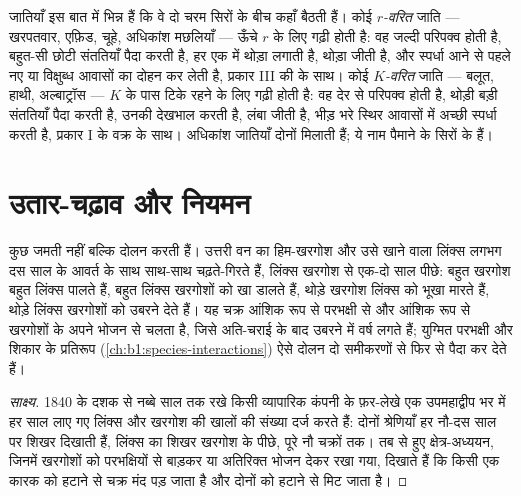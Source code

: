 \begin{definition}[जीवन-वृत्त की रणनीतियाँ]\label{def:b1:populations:rK}
जातियाँ इस बात में भिन्न हैं कि वे दो चरम सिरों के बीच कहाँ बैठती हैं।
कोई \emph{$r$-वरित} जाति --- खरपतवार, एफ़िड, चूहे, अधिकांश मछलियाँ ---
ऊँचे $r$ के लिए गढ़ी होती है: वह जल्दी परिपक्व होती है, बहुत-सी छोटी
संततियाँ पैदा करती है, हर एक में थोड़ा लगाती है, थोड़ा जीती है, और स्पर्धा
आने से पहले नए या विक्षुब्ध आवासों का दोहन कर लेती है, प्रकार III की
 के साथ। कोई \emph{$K$-वरित} जाति --- बलूत, हाथी, अल्बाट्रॉस
--- $K$ के पास टिके रहने के लिए गढ़ी होती है: वह देर से परिपक्व होती
है, थोड़ी बड़ी संततियाँ पैदा करती है, उनकी देखभाल करती है, लंबा जीती है,
भीड़ भरे स्थिर आवासों में अच्छी स्पर्धा करती है, प्रकार I के वक्र के साथ।
अधिकांश जातियाँ दोनों मिलाती हैं; ये नाम पैमाने के सिरों के हैं।
\end{definition}

\section{उतार-चढ़ाव और नियमन}

\begin{proposition}[परभक्षी और शिकार के चक्र]\label{prop:b1:populations:cycles}
कुछ  जमती नहीं बल्कि दोलन करती हैं। उत्तरी वन का हिम-खरगोश और
उसे खाने वाला लिंक्स लगभग दस साल के आवर्त के साथ साथ-साथ चढ़ते-गिरते
हैं, लिंक्स खरगोश से एक-दो साल पीछे: बहुत खरगोश बहुत लिंक्स पालते हैं,
बहुत लिंक्स खरगोशों को खा डालते हैं, थोड़े खरगोश लिंक्स को भूखा मारते
हैं, थोड़े लिंक्स खरगोशों को उबरने देते हैं। यह चक्र आंशिक रूप से परभक्षी
से और आंशिक रूप से खरगोशों के अपने भोजन से चलता है, जिसे अति-चराई के बाद
उबरने में वर्ष लगते हैं; युग्मित परभक्षी और शिकार के प्रतिरूप
(\cref{ch:b1:species-interactions}) ऐसे दोलन दो समीकरणों से फिर से पैदा
कर देते हैं।
\end{proposition}
\begin{proof}[साक्ष्य]
1840 के दशक से नब्बे साल तक रखे किसी व्यापारिक कंपनी के फ़र-लेखे एक
उपमहाद्वीप भर में हर साल लाए गए लिंक्स और खरगोश की खालों की संख्या दर्ज
करते हैं: दोनों श्रेणियाँ हर नौ-दस साल पर शिखर दिखाती हैं, लिंक्स का शिखर
खरगोश के पीछे, पूरे नौ चक्रों तक। तब से हुए क्षेत्र-अध्ययन, जिनमें
खरगोशों को परभक्षियों से बाड़कर या अतिरिक्त भोजन देकर रखा गया, दिखाते हैं
कि किसी एक कारक को हटाने से चक्र मंद पड़ जाता है और दोनों को हटाने से
मिट जाता है।
\end{proof}

